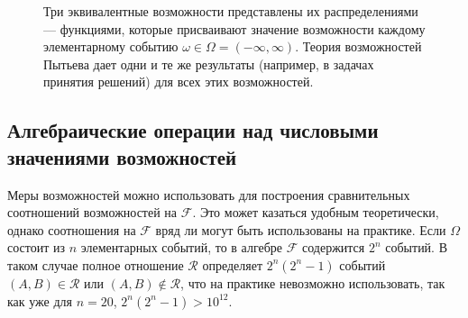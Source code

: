 \documentclass[a4paper, 14pt]{extarticle}
\begin{document}
\begin{figure}[h]
    	\begin{center}
		\caption{Три эквивалентные возможности представлены их распределениями — функциями, которые присваивают значение возможности каждому элементарному событию $\omega \in \Omega = (-\infty, \infty)$. Теория возможностей Пытьева дает одни и те же результаты (например, в задачах принятия решений) для всех этих возможностей.}
	\end{center}
\end{figure}

\subsection{Алгебраические операции над числовыми значениями возможностей}
Меры возможностей можно использовать для построения сравнительных соотношений возможностей на $\mathcal{F}$. Это может казаться удобным теоретически, однако соотношения на $\mathcal{F}$ вряд ли могут быть использованы на практике. Если $\Omega$ состоит из $n$ элементарных событий, то в алгебре $\mathcal{F}$ содержится $2^n$ событий. В таком случае полное отношение $\mathcal{R}$ определяет $2^n(2^n - 1)$ событий $(A, B) \in \mathcal{R}$ или $(A, B) \notin \mathcal{R}$, что на практике невозможно использовать, так как уже для $n = 20$, $2^n(2^n - 1) > 10^{12}$.
\end{document}
